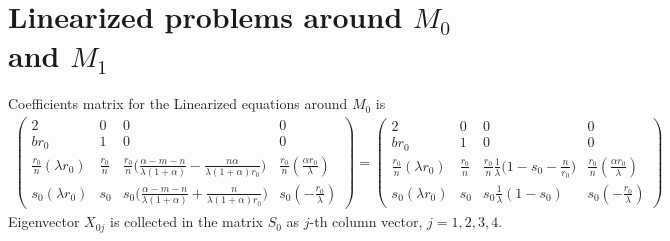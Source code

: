\documentclass[a4paper,11pt]{article}
\theoremstyle{remark}
\begin{document}
\section{Linearized problems around $M_0$ and $M_1$}\label{append:lin}
Coefficients matrix for the Linearized equations around $M_0$ is
\begin{align*}
 \begin{pmatrix}
          2 & 0 & 0 & 0 \\
          br_0 & 1 & 0 & 0\\
          \frac{r_0}{n}(\lambda r_0) & \frac{r_0}{n} & \frac{r_0}{n}\Big(\frac{\alpha-m-n}{\lambda(1+\alpha)} - \frac{n\alpha}{\lambda(1+\alpha)r_0}\Big) & \frac{r_0}{n}(\frac{\alpha r_0}{\lambda})\\
          s_0(\lambda r_0) & s_0 & s_0\Big(\frac{\alpha-m-n}{\lambda(1+\alpha)} + \frac{n}{\lambda(1+\alpha)r_0}\Big) & s_0(-\frac{r_0}{\lambda})
         \end{pmatrix}
        =\begin{pmatrix}
          2 & 0 & 0 & 0 \\
          br_0 & 1 & 0 & 0\\
          \frac{r_0}{n}(\lambda r_0) & \frac{r_0}{n} & \frac{r_0}{n}\frac{1}{\lambda}\Big(1-s_0-\frac{n}{r_0}\Big) & \frac{r_0}{n}(\frac{\alpha r_0}{\lambda})\\
          s_0(\lambda r_0) & s_0 & s_0\frac{1}{\lambda}(1-s_0) & s_0(-\frac{r_0}{\lambda})
         \end{pmatrix}
\end{align*}
Eigenvector $X_{0j}$ is collected in the matrix $S_0$ as $j$-th column vector, $j=1,2,3,4$.
\end{document}

